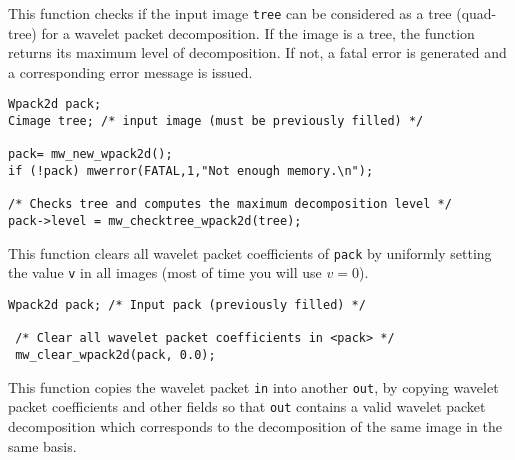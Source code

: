 \newpage %

\Description

This function checks if the input image \verb+tree+ can be considered
as a tree (quad-tree) for a wavelet packet decomposition.
If the image is a tree, the function returns its maximum level of decomposition.
If not, a fatal error is generated and a corresponding error message is issued.

\Next
\Example
\begin{verbatim}
Wpack2d pack;
Cimage tree; /* input image (must be previously filled) */

pack= mw_new_wpack2d();
if (!pack) mwerror(FATAL,1,"Not enough memory.\n");
  
/* Checks tree and computes the maximum decomposition level */   
pack->level = mw_checktree_wpack2d(tree);

\end{verbatim}


\newpage %

\Description
This function clears all wavelet packet coefficients of \verb+pack+
by uniformly setting the value \verb+v+ in all images (most of time you will 
use $v=0$).

\Next
\Example
\begin{verbatim}
Wpack2d pack; /* Input pack (previously filled) */

 /* Clear all wavelet packet coefficients in <pack> */
 mw_clear_wpack2d(pack, 0.0);
\end{verbatim}


\newpage %

\Description
This function copies the wavelet packet \verb+in+ into another \verb+out+,
by copying wavelet packet coefficients and other fields so that \verb+out+ contains
a valid wavelet packet decomposition which corresponds to the decomposition of
the same image in the same basis.

